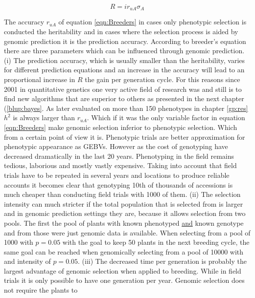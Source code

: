 \begin{equation}
  R = i r_{uA} \sigma_A
\label{eqn:Breeders}
\end{equation}

The accuracy $r_{uA}$ of equation \ref{eqn:Breeders} in cases only phenotypic selection is conducted the
heritability and in cases where the selection process is aided by genomic prediction it is the prediction
accuracy.  According to breeder's equation there are three parameters which can be influenced through genomic
prediction. \newline (i) The prediction accuracy, which is usually smaller than the heritability, varies for
different prediction equations and an increase in the accuracy will lead to an proportional increase in $R$
the gain per generation cycle. For this reasons since 2001 in quantitative genetics one very active field of
research was and still is to find new algorithms that are superior to others as presented in the next chapter
(\ref{blup:bayes}.  As later evaluated on more than 150 phenotypes in chapter \ref{gp:res} $h^2$ is always
larger than $r_{uA}$.  Which if it was the only variable factor in equation \ref{eqn:Breeders} make genomic
selection inferior to phenotypic selection. Which from a certain point of view it is. Phenotypic trials are
better approximation for phenotypic appearance as GEBVs. However as the cost of genotyping have decreased
dramatically in the last 20 years. Phenotyping in the field remains tedious, laborious and mostly vastly
expensive. Taking into account that field trials have to be repeated in several years and locations to produce
reliable accounts it becomes clear that genotyping 10th of thousands of accessions is much cheaper than
conducting field trials with 1000 of them. \newline (ii) The selection intensity can much stricter if the
total population that is selected from is larger and in genomic prediction settings they are, because it
allows selection from two pools. The first the pool of plants with known phenotyped \underline{and} known
genotype and from those were just genomic data is available. When selecting from a pool of 1000 with $p=0.05$
with the goal to keep 50 plants in the next breeding cycle, the same goal can be reached when genomically
selecting from a pool of 10000 with and intensity of $p=0.05$. \newline (iii) The decreased time per
generation is probably the largest advantage of genomic selection when applied to breeding. While in field
trials it is only possible to have one generation per year. Genomic selection does not require the plants to
